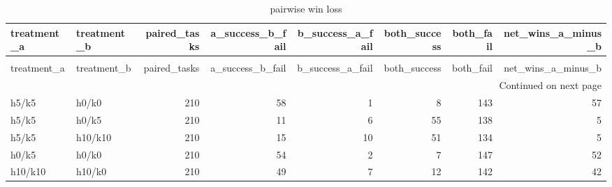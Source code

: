 \begin{longtable}{llrrrrrr}
\caption{pairwise win loss} \label{tab:pairwise_win_loss} \\
\toprule
treatment\_a & treatment\_b & paired\_tasks & a\_success\_b\_fail & b\_success\_a\_fail & both\_success & both\_fail & net\_wins\_a\_minus\_b \\
\midrule
\endfirsthead
\caption[]{pairwise win loss} \\
\toprule
treatment\_a & treatment\_b & paired\_tasks & a\_success\_b\_fail & b\_success\_a\_fail & both\_success & both\_fail & net\_wins\_a\_minus\_b \\
\midrule
\endhead
\midrule
\multicolumn{8}{r}{Continued on next page} \\
\midrule
\endfoot
\bottomrule
\endlastfoot
h5/k5 & h0/k0 & 210 & 58 & 1 & 8 & 143 & 57 \\
h5/k5 & h0/k5 & 210 & 11 & 6 & 55 & 138 & 5 \\
h5/k5 & h10/k10 & 210 & 15 & 10 & 51 & 134 & 5 \\
h0/k5 & h0/k0 & 210 & 54 & 2 & 7 & 147 & 52 \\
h10/k10 & h10/k0 & 210 & 49 & 7 & 12 & 142 & 42 \\
\end{longtable}
